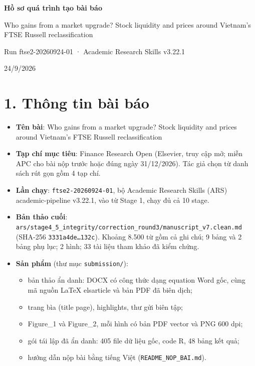 \documentclass[12pt,a4paper]{article}
\providecommand{\tightlist}{\setlength{\itemsep}{0pt}\setlength{\parskip}{0pt}}
\begin{document}
\begin{titlepage}\centering\vspace*{5cm}
{\LARGE\bfseries Hồ sơ quá trình tạo bài báo\par}\vspace{1em}
{\large Who gains from a market upgrade? Stock liquidity and prices
around Vietnam's FTSE Russell reclassification\par}\vspace{2em}
{Run ftse2-20260924-01 · Academic Research Skills v3.22.1\par}\vspace{1em}
{24/9/2026\par}
\end{titlepage}
\tableofcontents\newpage
\small
\hypertarget{thuxf4ng-tin-buxe0i-buxe1o}{%
\section{1. Thông tin bài báo}\label{thuxf4ng-tin-buxe0i-buxe1o}}

\begin{itemize}
\tightlist
\item
  \textbf{Tên bài}: Who gains from a market upgrade? Stock liquidity and
  prices around Vietnam's FTSE Russell reclassification
\item
  \textbf{Tạp chí mục tiêu}: Finance Research Open (Elsevier, truy cập
  mở; miễn APC cho bài nộp trước hoặc đúng ngày 31/12/2026). Tác giả
  chọn từ danh sách rút gọn gồm 4 tạp chí.
\item
  \textbf{Lần chạy}: \texttt{ftse2-20260924-01}, bộ Academic Research
  Skills (ARS) academic-pipeline v3.22.1, vào từ Stage 1, chạy đủ cả 10
  stage.
\item
  \textbf{Bản thảo cuối}:
  \texttt{ars/stage4\_5\_integrity/correction\_round3/manuscript\_v7.clean.md}
  (SHA-256 \texttt{3331a4de…132c}). Khoảng 8.500 từ gồm cả ghi chú; 9
  bảng và 2 bảng phụ lục; 2 hình; 33 tài liệu tham khảo đã kiểm chứng.
\item
  \textbf{Sản phẩm} (thư mục \texttt{submission/}):

  \begin{itemize}
  \tightlist
  \item
    bản thảo ẩn danh: DOCX có công thức dạng equation Word gốc, cùng mã
    nguồn LaTeX elsarticle và bản PDF đã biên dịch;
  \item
    trang bìa (title page), highlights, thư gửi biên tập;
  \item
    Figure\_1 và Figure\_2, mỗi hình có bản PDF vector và PNG 600 dpi;
  \item
    gói tái lập đã ẩn danh: 405 file dữ liệu gốc, code R, 48 bảng kết
    quả;
  \item
    hướng dẫn nộp bài bằng tiếng Việt (\texttt{README\_NOP\_BAI.md}).
  \end{itemize}
\end{itemize}
\end{document}
